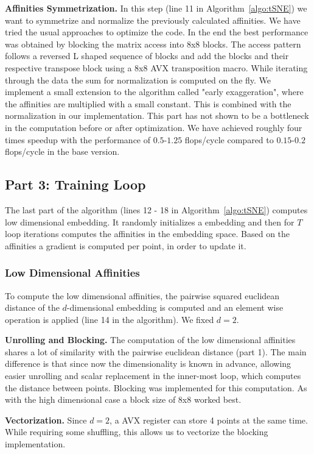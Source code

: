 \documentclass[letterpaper]{article}
\newcommand{\mypar}[1]{{\bf #1.}}
\begin{document}
\mypar{Affinities Symmetrization}
In this step (line 11 in Algorithm~\ref{algo:tSNE}) we want to symmetrize and normalize the previously calculated affinities. We have tried the usual approaches to optimize the code. In the end the best performance was obtained by blocking the matrix access into 8x8 blocks. The access pattern follows a reversed L shaped sequence of blocks and add the blocks and their respective transpose block using a 8x8 AVX transposition macro. While iterating through the data the sum for normalization is computed on the fly. We implement a small extension to the algorithm called "early exaggeration", where the affinities are multiplied with a small constant. This is combined with the normalization in our implementation. This part has not shown to be a bottleneck in the computation before or after optimization. We have achieved roughly four times speedup with the performance of $0.5$-$1.25$ flops/cycle compared to $0.15$-$0.2$ flops/cycle in the base version.

\subsection{Part 3: Training Loop}
The last part of the algorithm (lines 12 - 18 in Algorithm~\ref{algo:tSNE}) computes low dimensional embedding. It randomly initializes a embedding and then for $T$ loop iterations computes the affinities in the embedding space.
Based on the affinities a gradient is computed per point, in order to update it.

\subsubsection{Low Dimensional Affinities}

To compute the low dimensional affinities, the pairwise squared euclidean distance of the $d$-dimensional embedding is computed and an element wise operation is applied (line 14 in the algorithm). We fixed $d=2$.

\mypar{Unrolling and Blocking}
The computation of the low dimensional affinities shares a lot of similarity with the pairwise euclidean distance (part 1). The main difference is that since now the dimensionality is known in advance, allowing easier unrolling and scalar replacement in the inner-most loop, which computes the distance between points. Blocking was implemented for this computation. As with the high dimensional case a block size of 8x8 worked best.

\mypar{Vectorization}
Since $d=2$, a AVX register can store 4 points at the same time. While requiring some shuffling, this allows us to vectorize the blocking implementation.
\end{document}
